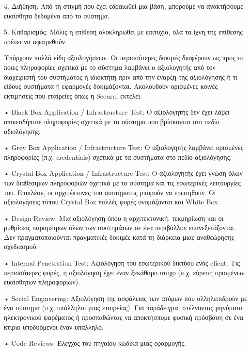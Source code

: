 4. Διήθηση: Από τη στιγμή που έχει εδραιωθεί μια βάση, μπορούμε να ανακτήσουμε
ευαίσθητα δεδομένα από το σύστημα.

5. Καθαρισμός: Μόλις η επίθεση ολοκληρωθεί με επιτυχία, όλα τα ίχνη της επίθεσης
πρέπει να αφαιρεθούν.

Υπάρχουν πολλά είδη αξιολογήσεων. Οι περισσότερες δοκιμές διαφέρουν ως προς το
ποιες πληροφορίες σχετικά με το σύστημα λαμβάνει ο αξιολογητής από τον διαχειριστή του συστήματος ή
ιδιοκτήτη πριν από την έναρξη της αξιολόγησης ή τι είδους συστήματα ή εφαρμογές
δοκιμάζονται. Ακολουθούν ορισμένες κοινές εκτιμήσεις που εταιρείες όπως η
\textlatin{Secura}, εκτελεί:

• \textlatin{Black Box Application / Infrastructure Test}: Ο αξιολογητής δεν
έχει λάβει οποιεσδήποτε πληροφορίες σχετικά με το σύστημα που βρίσκονται στο
πεδίο αξιολόγησης.

• \textlatin{Grey Box Application / Infrastructure Test:} Ο αξιολογητής
λαμβάνει ορισμένες πληροφορίες (π.χ. \textlatin{credentials}) σχετικά με τα
συστήματα στο πεδίο αξιολόγησης.

• \textlatin{Crystal Box Application / Infrastructure Test:} Ο αξιολογητής έχει
γνώση όλων των  διαθέσιμων πληροφοριών σχετικά με το σύστημα και τις εσωτερικές
λειτουργίες του. Επιπλέον, οι αρχιτέκτονες του συστήματος μπορούν να ερωτηθούν.
Οι αξιολογήσεις τύπου \textlatin{Crystal Box} πολλές φορές ονομάζονται και
\textlatin{White Box.}

• \textlatin{Design Review}: Μια αξιολόγηση όπου η αρχιτεκτονική, τεκμηρίωση
και οι ρυθμίσεις παραμέτρων όλων των συστημάτων σε ένα περιβάλλον
επανεξετάζονται. Δεν πραγματοποιούνται πραγματικές δοκιμές κατά τη διάρκεια
μιας αναθεώρησης σχεδιασμού.

• \textlatin{Internal Penetration Test:} Αξιολόγηση του εσωτερικού δικτύου ενός
\textlatin{client}. Τις περισσότερες φορές, η αξιολόγηση έχει έναν ξεκάθαρο
στόχο (π.χ. εύρεση ορισμένων ευαίσθητων πληροφοριών).

• \textlatin{Social Engineering}: Αξιολόγηση της ασφάλειας των ατόμων που
αλληλεπιδρούν με ένα σύστημα (π.χ. υπάλληλοι μιας εταιρείας). Για παράδειγμα,
στέλνοντας μηνύματα ηλεκτρονικού ψαρέματος ή προσπαθώντας να αποκτήσπυμε φυσική
πρόσβαση σε ένα κτίριο υποδυόμενοι έναν υπάλληλο.

• \textlatin{Code Reviews}: Έλεγχος του πηγαίου κώδικα μιας εφαρμογής.
